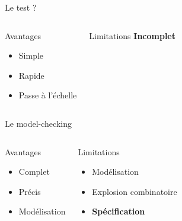 \documentclass{beamer}
\begin{document}
\appendix

\begin{frame}{Le test ?}


  \begin{columns}[onlytextwidth, T]
  \begin{exampleblock}{Avantages}
    \begin{itemize}
    \item Simple
    \item Rapide
    \item Passe à l'échelle
    \end{itemize}
  \end{exampleblock}

  \begin{alertblock}{Limitations}
    \textbf{Incomplet}
  \end{alertblock}
  \end{columns}
\end{frame}

\begin{frame}{Le model-checking}


  \begin{columns}[onlytextwidth, T]
  \begin{exampleblock}{Avantages}
    \begin{itemize}
    \item Complet
    \item Précis
    \item Modélisation
    \end{itemize}
  \end{exampleblock}

  \begin{alertblock}{Limitations}
    \begin{itemize}
    \item Modélisation
    \item Explosion combinatoire
    \item \textbf{Spécification}
    \end{itemize}
  \end{alertblock}
  \end{columns}
\end{frame}
\end{document}
